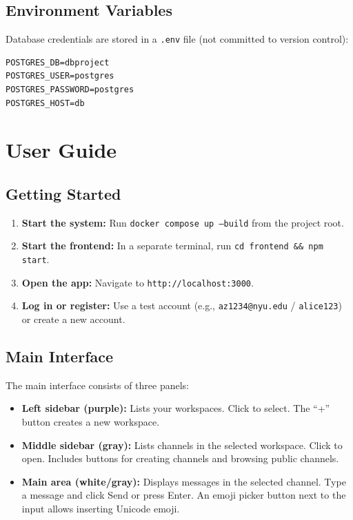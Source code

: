 \documentclass[11pt]{article}
\begin{document}
\subsection{Environment Variables}

Database credentials are stored in a \texttt{.env} file (not committed to version control):

\begin{lstlisting}
POSTGRES_DB=dbproject
POSTGRES_USER=postgres
POSTGRES_PASSWORD=postgres
POSTGRES_HOST=db
\end{lstlisting}


\newpage
\section{User Guide}
\label{sec:guide}

\subsection{Getting Started}

\begin{enumerate}
    \item \textbf{Start the system:} Run \texttt{docker compose up --build} from the project root.
    \item \textbf{Start the frontend:} In a separate terminal, run \texttt{cd frontend \&\& npm start}.
    \item \textbf{Open the app:} Navigate to \texttt{http://localhost:3000}.
    \item \textbf{Log in or register:} Use a test account (e.g., \texttt{az1234@nyu.edu} / \texttt{alice123}) or create a new account.
\end{enumerate}

\subsection{Main Interface}

The main interface consists of three panels:
\begin{itemize}
    \item \textbf{Left sidebar (purple):} Lists your workspaces. Click to select. The ``+'' button creates a new workspace.
    \item \textbf{Middle sidebar (gray):} Lists channels in the selected workspace. Click to open. Includes buttons for creating channels and browsing public channels.
    \item \textbf{Main area (white/gray):} Displays messages in the selected channel. Type a message and click Send or press Enter. An emoji picker button next to the input allows inserting Unicode emoji.
\end{itemize}
\end{document}

